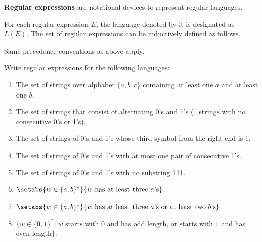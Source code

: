\documentclass[11pt]{article}
\begin{document}
{\item \textbf{Regular expressions} are notational devices to represent
regular languages.

\begin{udefinition}  For each regular expression
$E$,  the language denoted by it is designated as $L(E)$. The set of
regular expressions can be inductively defined as follows.

\end{udefinition}


\item Same precedence conventions as above apply.

\begin{uexercise}\label{writere} Write regular expressions for the following languages:
\begin{enumerate}
\item\label{writerea} The set of strings over alphabet $\{a,b,c\}$ containing at least one $a$ and at least one $b$.
\item\label{writereb} The set of strings that consist of alternating 0's and 1's (=strings with
no consecutive 0's or 1's).
\item\label{writerec} The set of strings of 0's and 1's whose third symbol from the right end is 1.
\item\label{writered} The set of strings of 0's and 1's with at most one pair of consecutive 1's.
\item\label{writeree} The set of strings of 0's and 1's with no substring 111. 
\item\label{writeref} $\setabs{w\in \{a,b\}^*}{w \text{ has at least three } a\text{'s} }$.
\item\label{writereg} $\setabs{w\in \{a,b\}^*}{w \text{ has at least three } a\text{'s or
 at least
two } b\text{'s}}$.
\item\label{writereh} $\{w\in \{0,1\}^*\, |\, w \text{ starts with 0 and has
				odd length, or starts with 1}$ and has even length$\}$.


\end{enumerate}
\end{uexercise}}
\end{document}
